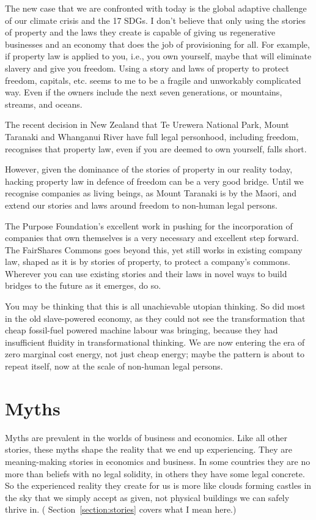 The new case that we are confronted with today is the global adaptive challenge of our climate crisis and the 17 SDGs. I don't believe that only using the stories of property and the laws they create is capable of giving us regenerative businesses and an economy that does the job of provisioning for all. For example, if property law is applied to you, i.e., you own yourself, maybe that will eliminate slavery and give you freedom. Using a story and laws of property to protect freedom, capitals, etc. seems to me to be a fragile and unworkably complicated way. Even if the owners include the next seven generations, or mountains, streams, and oceans. 


The recent decision in New Zealand that Te Urewera National Park, Mount Taranaki and Whanganui River have full legal personhood, including freedom, recognises that property law, even if you are deemed to own yourself, falls short.


However, given the dominance of the stories of property in our reality today, hacking property law in defence of freedom can be a very good bridge. Until we recognise companies as living beings, as Mount Taranaki is by the Maori, and extend our stories and laws around freedom to non-human legal persons.


The Purpose Foundation’s excellent work in pushing for the incorporation of companies that own themselves is a very necessary and excellent step forward. The FairShares Commons goes beyond this, yet still works in existing company law, shaped as it is by stories of property, to protect a company’s commons. Wherever you can use existing stories and their laws in novel ways to build bridges to the future as it emerges, do so.


You may be thinking that this is all unachievable utopian thinking. So did most in the old slave-powered economy, as they could not see the transformation that cheap fossil-fuel powered machine labour was bringing, because they had insufficient fluidity in transformational thinking. We are now entering the era of zero marginal cost energy, not just cheap energy\cite{rifkin-zero-mc}; maybe the pattern is about to repeat itself, now at the scale of non-human legal persons.




\section{Myths}
\label{section:myths-of-incorporation}
Myths are prevalent in the worlds of business and economics. Like all other stories, these myths shape the reality that we end up experiencing. They are meaning\hyp{}making stories in economics and business. In some countries they are no more than beliefs with no legal solidity, in others they have some legal concrete. So the experienced reality they create for us is more like clouds forming castles in the sky that we simply accept as given, not physical buildings we can safely thrive in. ( Section~\ref{section:stories} covers what I mean here.)


